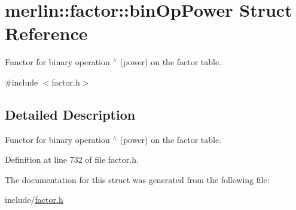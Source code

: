 \hypertarget{structmerlin_1_1factor_1_1binOpPower}{}\section{merlin\+:\+:factor\+:\+:bin\+Op\+Power Struct Reference}
\label{structmerlin_1_1factor_1_1binOpPower}


Functor for binary operation $^\wedge$ (power) on the factor table.  




{\ttfamily \#include $<$factor.\+h$>$}



\subsection{Detailed Description}
Functor for binary operation $^\wedge$ (power) on the factor table. 

Definition at line 732 of file factor.\+h.



The documentation for this struct was generated from the following file\+:\begin{DoxyCompactItemize}
\item 
include/\hyperlink{factor_8h}{factor.\+h}\end{DoxyCompactItemize}
